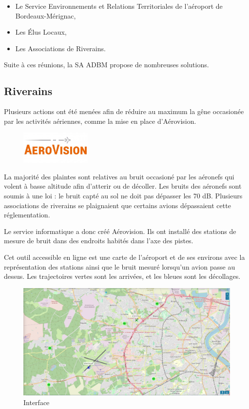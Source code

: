\begin{itemize}
  \item Le Service Environnements et Relations Territoriales de l'aéroport de Bordeaux-Mérignac,
  \item Les Élus Locaux,
  \item Les Associations de Riverains.
\end{itemize}

Suite à ces réunions, la SA ADBM propose de nombreuses solutions.\newline

\subsection{Riverains}

Plusieurs actions ont été menées afin de réduire au maximum la gêne occasionée par les activités aériennes, comme la mise en place d'Aérovision.

\begin{figure}[hbt!]
  \centering
  \includegraphics[width=3.5cm]{Images/logo_aerovision.jpg}
  \label{fig:logoaerovision}
\end{figure}

La majorité des plaintes sont relatives au bruit occasioné par les aéronefs qui volent à basse altitude afin d'atterir ou de décoller.
Les bruits des aéronefs sont soumis à une loi : le bruit capté au sol ne doit pas dépasser les 70 dB. Plusieurs associations de riverains se plaignaient que certains avions dépassaient cette réglementation.\newline

Le service informatique a donc créé Aérovision. Ils ont installé des stations de mesure de bruit dans des endroits habités dans l'axe des pistes.

Cet outil accessible en ligne est une carte de l'aéroport et de ses environs avec la représentation des stations ainsi que le bruit mesuré lorsqu'un avion passe au dessus. Les trajectoires vertes sont les arrivées, et les bleues sont les décollages.

\begin{figure}[hbt!]
  \centering
  \includegraphics[width=17.4cm]{Images/aerovision.png}\newline
  \caption{Interface}
  \label{fig:interfaceaerovision}
\end{figure}

